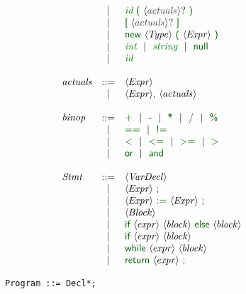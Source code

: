 \begin{figure}[H]
\begin{minipage}{0.5\textwidth}
\[\begin{array}[t]{lcl@{\hspace{0.4cm}}}
                     & \VB   & \terminal{id}\ \vterminal{(}\ \ntq{actuals}\ \vterminal{)} \\
                     & \VB   & \vterminal{[}\ \ntq{actuals}\ \vterminal{]} \\
                     & \VB   & \vterminal{new}\ \nt{Type}\ \vterminal{(}\ \nt{Expr}\ \vterminal{)} \\
                     & \VB   & \terminal{int}\ \VB\ \terminal{string}\ \VB\ \vterminal{null} \\
                     & \VB   & \terminal{id} \\
          \\
          \nta{actuals} & \Prod & \nt{Expr} \\
                        & \VB   & \nt{Expr} \vterminal{,}\ \nt{actuals} \\
          \\
          \nta{binop} & \Prod &
              \vterminal{+}
                      \ \VB\ \vterminal{-}
                      \ \VB\ \vterminal{*}
                      \ \VB\ \vterminal{/}
                      \ \VB\ \vterminal{\%}\\
                      & \VB& \vterminal{==}
                      \ \VB\ \vterminal{!=}\\
                      & \VB&  \vterminal{$<$}
                      \ \VB\ \vterminal{$<=$}
                      \ \VB\ \vterminal{$>=$}
                      \ \VB\ \vterminal{$>$}
                      \\
                      & \VB& \vterminal{or}
                      \ \VB\ \vterminal{and}\\
          \\
          \nta{Stmt} & \Prod & \nt{VarDecl} \\
                     & \VB   & \nt{Expr}\ \vterminal{;} \\
                     & \VB   & \nt{Expr}\ \vterminal{:=}\ \nt{Expr}\ \vterminal{;}\\
                     & \VB   & \nt{Block} \\
                     & \VB   & \vterminal{if}\ \nt{expr}\ \nt{block}\ \vterminal{else}\ \nt{block} \\
                     & \VB   & \vterminal{if}\ \nt{expr}\ \nt{block} \\
                     & \VB   & \vterminal{while}\ \nt{expr}\ \nt{block} \\
                     & \VB   & \vterminal{return}\ \nt{expr}\ \vterminal{;}\\
        \end{array}
      \]
        \end{minipage}%
        \begin{minipage}{0.8\textwidth}
            \hfill
\begin{lrbox}{\mylistingbox}
        \begin{lstlisting}[language=JastAdd]
    Program ::= Decl*;


\end{lstlisting}
\end{lrbox}
\end{minipage}
\end{figure}
